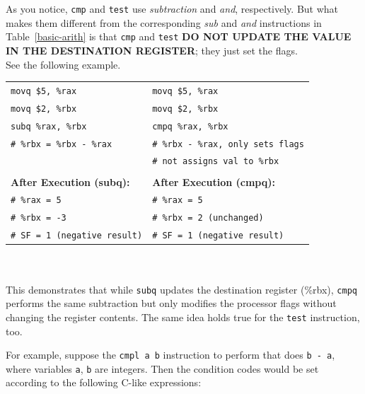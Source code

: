 \documentclass{article}
\begin{document}
As you notice, \texttt{cmp} and \texttt{test} use \textit{subtraction} and \textit{and}, respectively. But what makes them different from the corresponding \textit{sub} and \textit{and} instructions in Table~\ref{basic-arith} is that \texttt{cmp} and \texttt{test} \textbf{DO NOT UPDATE THE VALUE IN THE DESTINATION REGISTER}; they just set the flags.\\
See the following example.
\\
\begin{tabular}{l l}
\texttt{movq \$5, \%rax}   & \texttt{movq \$5, \%rax}   \\
\texttt{movq \$2, \%rbx}   & \texttt{movq \$2, \%rbx}   \\
\texttt{subq \%rax, \%rbx} & \texttt{cmpq \%rax, \%rbx} \\ 
\texttt{\# \%rbx = \%rbx - \%rax} & \texttt{\# \%rbx - \%rax, only sets flags} \\ 
                                & \texttt{\# not assigns val to \%rbx} \\ 
\\
\textbf{After Execution (subq):}  & \textbf{After Execution (cmpq):}  \\
\texttt{\# \%rax = 5}      & \texttt{\# \%rax = 5}      \\
\texttt{\# \%rbx = -3}     & \texttt{\# \%rbx = 2  (unchanged)} \\
\texttt{\# SF = 1 (negative result)} & \texttt{\# SF = 1 (negative result)}
\end{tabular}
\\
\\
This demonstrates that while \texttt{subq} updates the destination register (\%rbx), \texttt{cmpq} performs the same subtraction but only modifies the processor flags without changing the register contents. The same idea holds true for the \texttt{test} instruction, too.


For example, suppose the \texttt{cmpl a b} instruction to perform that does \texttt{b - a}, where variables \texttt{a}, \texttt{b} are integers. Then the condition codes would be set according to the following C-like expressions:
\end{document}
